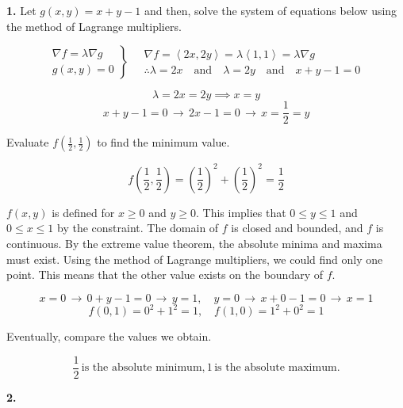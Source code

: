 \documentclass{article}
\begin{document}
\textbf{1.} Let $g(x,y)=x+y-1$ and then, solve the system of equations below using the method of Lagrange multipliers.

\[
\left.
\begin{array}{ll}
\displaystyle\nabla f =\lambda \nabla g \\
\displaystyle g(x,y) = 0
\end{array}
\right\}\quad
\begin{array}{ll}
\nabla f = \left\langle 2x, 2y\right\rangle = \lambda\left\langle1,1\right\rangle = \lambda\nabla g\\\therefore\displaystyle \lambda = 2x\quad \text{and}\quad \lambda = 2y\quad \text{and}\quad x+y-1=0
\end{array}
\]

\[\lambda=2x=2y\implies x=y\]
\[x+y-1=0 \,\rightarrow\, 2x-1 = 0\,\rightarrow\,x=\frac12=y\]

Evaluate $\displaystyle f\left(\frac12,\frac12\right)$ to find the minimum value.

\[f\left(\frac12,\frac12\right)=\left(\frac12\right)^2+\left(\frac12\right)^2=\frac12\]

$f(x,y)$ is defined for $x\geq0$ and $y\geq0$. This implies that $0\leq y \leq1$ and $0\leq x\leq1$ by the constraint. The domain of $f$ is closed and bounded, and $f$ is continuous. By the extreme value theorem, the absolute minima and maxima must exist. Using the method of Lagrange multipliers, we could find only one point. This means that the other value exists on the boundary of $f$.

\[x=0\,\rightarrow\,0+y-1=0\,\rightarrow\,y=1,\quad y=0\,\rightarrow\, x+0-1=0\,\rightarrow\, x=1\]
\[f(0,1) = 0^2 +1^2 = 1,\quad f(1,0) = 1^2+0^2 = 1\]

Eventually, compare the values we obtain.

\[\boxed{\frac12\,\text{is the absolute minimum}, 1\,\text{is the absolute maximum}.}\]

\vspace{1em}

\textbf{2.}
\end{document}
